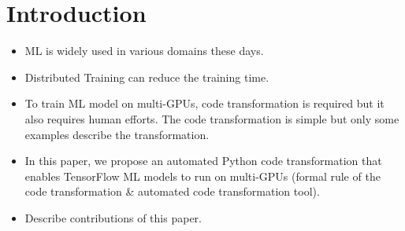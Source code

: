 \section{Introduction}\label{sec:intro}
\begin{itemize}
  \item ML is widely used in various domains these days.
  \item Distributed Training can reduce the training time.
  \item To train ML model on multi-GPUs, code transformation is required but it
    also requires human efforts. The code transformation is simple but only
    some examples describe the transformation.
  \item In this paper, we propose an automated Python code transformation that
    enables TensorFlow ML models to run on multi-GPUs (formal rule of the code
    transformation \& automated code transformation tool).
  \item Describe contributions of this paper.
\end{itemize}
